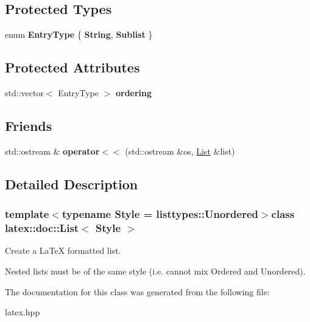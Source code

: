 \subsection*{\-Protected \-Types}
\begin{DoxyCompactItemize}
\item 
enum {\bfseries \-Entry\-Type} \{ {\bfseries \-String}, 
{\bfseries \-Sublist}
 \}
\end{DoxyCompactItemize}
\subsection*{\-Protected \-Attributes}
\begin{DoxyCompactItemize}
\item 
\hypertarget{classlatex_1_1doc_1_1List_ae8e20e36cd4a198bd9062d5fe7578f00}{std\-::vector$<$ \-Entry\-Type $>$ {\bfseries ordering}}\label{classlatex_1_1doc_1_1List_ae8e20e36cd4a198bd9062d5fe7578f00}

\end{DoxyCompactItemize}
\subsection*{\-Friends}
\begin{DoxyCompactItemize}
\item 
\hypertarget{classlatex_1_1doc_1_1List_a9cf2b64b3af2172b2feedf0b75bda63d}{std\-::ostream \& {\bfseries operator$<$$<$} (std\-::ostream \&os, \hyperlink{classlatex_1_1doc_1_1List}{\-List} \&list)}\label{classlatex_1_1doc_1_1List_a9cf2b64b3af2172b2feedf0b75bda63d}

\end{DoxyCompactItemize}


\subsection{\-Detailed \-Description}
\subsubsection*{template$<$typename \-Style = listtypes\-::\-Unordered$>$class latex\-::doc\-::\-List$<$ Style $>$}

\-Create a \-La\-Te\-X formatted list.

\-Nested lists must be of the same style (i.\-e. cannot mix \-Ordered and \-Unordered). 

\-The documentation for this class was generated from the following file\-:\begin{DoxyCompactItemize}
\item 
latex.\-hpp\end{DoxyCompactItemize}

